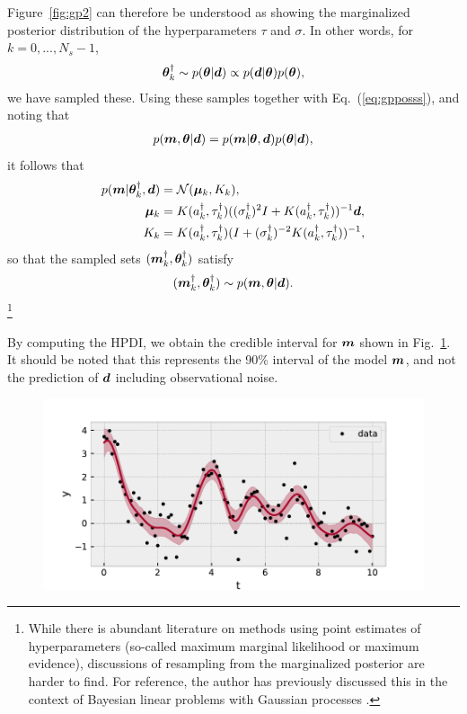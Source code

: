 Figure~\ref{fig:gp2} can therefore be understood as showing the marginalized posterior distribution of the hyperparameters $\tau$ and $\sigma$. In other words, for $k=0,..., N_s-1$,
\begin{align}
\label{eq:gmposts}
\boldsymbol{\theta}^\dagger_k \sim p(\boldsymbol{\theta}|\boldsymbol{d}) \propto p(\boldsymbol{d}|\boldsymbol{\theta}) p(\boldsymbol{\theta}),
\end{align}
we have sampled these. Using these samples together with Eq.~(\ref{eq:gpposss}), and noting that
\begin{align}
\label{eq:gpposssaq}
p(\boldsymbol{m}, \boldsymbol{\theta}|\boldsymbol{d}) = p(\boldsymbol{m}|\boldsymbol{\theta}, \boldsymbol{d}) p(\boldsymbol{\theta}|\boldsymbol{d}),
\end{align}
it follows that
\begin{align}
\label{eq:gpposssaahuq}
 p(\boldsymbol{m}|\boldsymbol{\theta}^\dagger_k, \boldsymbol{d}) &= \mathcal{N} ( \boldsymbol{\mu}_k ,  K_k ), \\
 \label{eq:muvk}
 \boldsymbol{\mu}_k &= K(a^\dagger_k,\tau^\dagger_k) ((\sigma^\dagger_k)^{2} I + K(a^\dagger_k,\tau^\dagger_k) )^{-1} \boldsymbol{d}, \\
  \label{eq:Kk}
 K_k &= K(a^\dagger_k,\tau^\dagger_k)(I + (\sigma^\dagger_k)^{-2} K(a^\dagger_k,\tau^\dagger_k) )^{-1},
\end{align}
so that the sampled sets $(\boldsymbol{m}^\dagger_k,\boldsymbol{\theta}^\dagger_k)$ satisfy
\begin{align}
\label{eq:gpposssaqp}
(\boldsymbol{m}^\dagger_k,\boldsymbol{\theta}^\dagger_k) \sim p(\boldsymbol{m}, \boldsymbol{\theta}|\boldsymbol{d}).
\end{align}
\footnote{While there is abundant literature on methods using point estimates of hyperparameters (so-called maximum marginal likelihood or maximum evidence), discussions of resampling from the marginalized posterior are harder to find. For reference, the author has previously discussed this in the context of Bayesian linear problems with Gaussian processes \cite{2020ApJ...900...48K}.}

By computing the HPDI, we obtain the credible interval for $\boldsymbol{m}$ shown in Fig.~\ref{fig:gp4}. It should be noted that this represents the 90\% interval of the model $\boldsymbol{m}$, and not the prediction of $\boldsymbol{d}$ including observational noise.
\begin{figure}[htb]
\begin{center}
\includegraphics[width=\linewidth]{fig/gp/gp4.pdf}
\caption{\label{fig:gp4}}
\end{center}
\end{figure}
